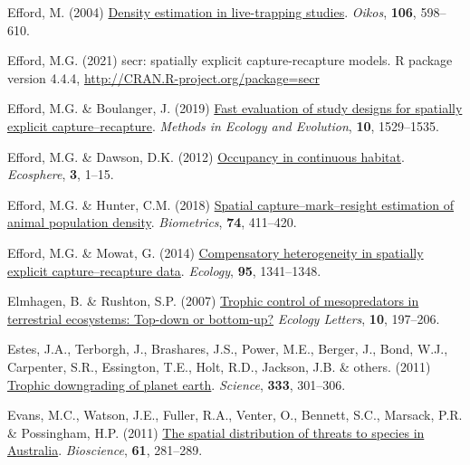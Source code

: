 \documentclass[11pt,a4paper,titlepage,twoside,openright]{style/unimelbthesis}
\newenvironment{CSLReferences}%
  {}%
  {\par}
\begin{document}
\begin{mainmatter}
\begin{CSLReferences}{1}{0}
\leavevmode{}%
Efford, M. (2004) \href{https://doi.org/10.1111/j.0030-1299.2004.13043.x}{Density estimation in live-trapping studies}. \emph{Oikos}, \textbf{106}, 598--610.

\leavevmode{}%
Efford, M.G. (2021) {secr: spatially explicit capture-recapture models. R package version 4.4.4}, \url{http://CRAN.R-project.org/package=secr}

\leavevmode{}%
Efford, M.G. \& Boulanger, J. (2019) \href{https://doi.org/10.1111/2041-210X.13239}{Fast evaluation of study designs for spatially explicit capture--recapture}. \emph{Methods in Ecology and Evolution}, \textbf{10}, 1529--1535.

\leavevmode{}%
Efford, M.G. \& Dawson, D.K. (2012) \href{https://doi.org/10.1890/ES11-00308.1}{Occupancy in continuous habitat}. \emph{Ecosphere}, \textbf{3}, 1--15.

\leavevmode{}%
Efford, M.G. \& Hunter, C.M. (2018) \href{https://doi.org/10.1111/biom.12766}{Spatial capture--mark--resight estimation of animal population density}. \emph{Biometrics}, \textbf{74}, 411--420.

\leavevmode{}%
Efford, M.G. \& Mowat, G. (2014) \href{https://doi.org/10.1890/13-1497.1}{Compensatory heterogeneity in spatially explicit capture--recapture data}. \emph{Ecology}, \textbf{95}, 1341--1348.

\leavevmode{}%
Elmhagen, B. \& Rushton, S.P. (2007) \href{https://doi.org/10.1111/j.1461-0248.2006.01010.x}{Trophic control of mesopredators in terrestrial ecosystems: Top-down or bottom-up?} \emph{Ecology Letters}, \textbf{10}, 197--206.

\leavevmode{}%
Estes, J.A., Terborgh, J., Brashares, J.S., Power, M.E., Berger, J., Bond, W.J., Carpenter, S.R., Essington, T.E., Holt, R.D., Jackson, J.B. \& others. (2011) \href{https://doi.org/10.1126/science.1205106}{Trophic downgrading of planet earth}. \emph{Science}, \textbf{333}, 301--306.

\leavevmode{}%
Evans, M.C., Watson, J.E., Fuller, R.A., Venter, O., Bennett, S.C., Marsack, P.R. \& Possingham, H.P. (2011) \href{https://doi.org/10.1525/bio.2011.61.4.8}{The spatial distribution of threats to species in {A}ustralia}. \emph{Bioscience}, \textbf{61}, 281--289.


\end{CSLReferences}
\end{mainmatter}
\end{document}
